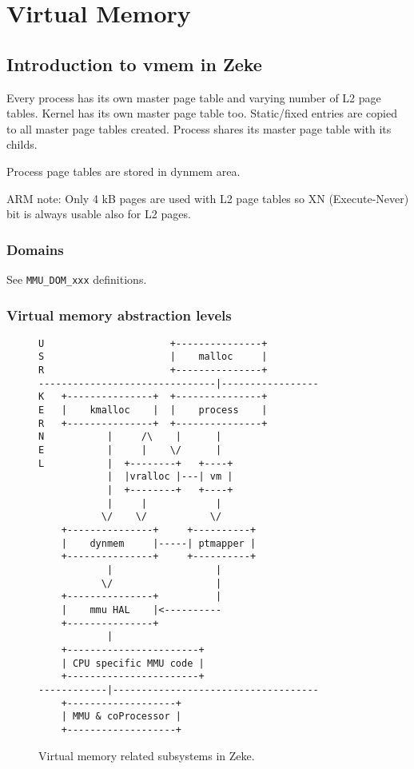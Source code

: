 \chapter{Virtual Memory}

\section{Introduction to vmem in Zeke}

Every process has its own master page table and varying number of L2 page
tables. Kernel has its own master page table too. Static/fixed entries are
copied to all master page tables created. Process shares its master page
table with its childs.

Process page tables are stored in dynmem area.

ARM note: Only 4 kB pages are used with L2 page tables so XN (Execute-Never) bit
is always usable also for L2 pages.

\subsection{Domains}

See \verb+MMU_DOM_xxx+ definitions.

\subsection{Virtual memory abstraction levels}

\begin{figure}
\begin{verbatim}
U                      +---------------+
S                      |    malloc     |
R                      +---------------+
-------------------------------|-----------------
K   +---------------+  +---------------+
E   |    kmalloc    |  |    process    |
R   +---------------+  +---------------+
N           |     /\    |      |
E           |     |    \/      |
L           |  +--------+   +----+
            |  |vralloc |---| vm |
            |  +--------+   +----+
            |     |            |
           \/    \/           \/
    +---------------+     +----------+
    |    dynmem     |-----| ptmapper |
    +---------------+     +----------+
            |                  |
           \/                  |
    +---------------+          |
    |    mmu HAL    |<----------
    +---------------+
            |
    +-----------------------+
    | CPU specific MMU code |
    +-----------------------+
------------|------------------------------------
    +-------------------+
    | MMU & coProcessor |
    +-------------------+
\end{verbatim}
\caption{Virtual memory related subsystems in Zeke.}
\label{figure:vmsubsys}
\end{figure}

